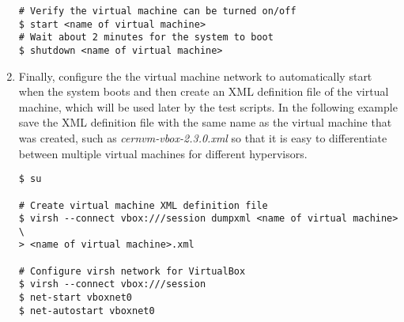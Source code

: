 \begin{enumerate}
\begin{lstlisting}
# Verify the virtual machine can be turned on/off
$ start <name of virtual machine>
# Wait about 2 minutes for the system to boot
$ shutdown <name of virtual machine>
\end{lstlisting}

\item	Finally, configure the the virtual machine network to automatically start when the system boots and then create an
		XML definition file of the virtual machine, which will be used later by the test scripts. In the following example 
		save the XML definition file with the same name as the virtual machine that was created, such as 
		\emph{cernvm-vbox-2.3.0.xml} so that it is easy to differentiate between multiple virtual machines for different
		hypervisors.

\lstset{language=bash,caption=Create XML Definition File and Configure Network}
\begin{lstlisting}
$ su

# Create virtual machine XML definition file
$ virsh --connect vbox:///session dumpxml <name of virtual machine> \
> <name of virtual machine>.xml

# Configure virsh network for VirtualBox
$ virsh --connect vbox:///session
$ net-start vboxnet0
$ net-autostart vboxnet0
\end{lstlisting}				
\end{enumerate}




\newpage
